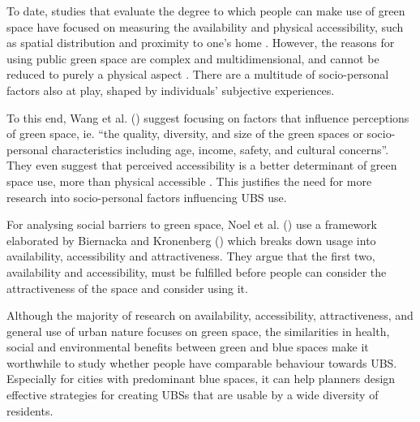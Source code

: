 \documentclass{article}
\begin{document}
To date, studies that evaluate the degree to which people can make use of green space have focused on measuring the availability and physical accessibility, such as spatial distribution and proximity to one's home \parencite{REF}.
However, the reasons for using public green space are complex and multidimensional, and cannot be reduced to purely a physical aspect \parencite{wang2015physical}. There are a multitude of socio-personal factors also at play, shaped by individuals' subjective experiences. %

To this end, Wang et al. (\citeyear{wang2015physical}) suggest focusing on factors that influence perceptions of green space, ie. ``the quality, diversity, and size of the green spaces or socio-personal characteristics including age, income, safety, and cultural concerns''. They even suggest that perceived accessibility is a better determinant of green space use, more than physical accessible \parencite{wang2015comparison}. This justifies the need for more research into socio-personal factors influencing UBS use.

For analysing social barriers to green space, Noel et al. (\citeyear{noel2021social}) use a framework elaborated by Biernacka and Kronenberg (\citeyear{biernacka2018classification}) which breaks down usage into availability, accessibility and attractiveness. They argue that the first two, availability and accessibility, must be fulfilled before people can consider the attractiveness of the space and consider using it.

Although the majority of research on availability, accessibility, attractiveness, and general use of urban nature focuses on green space, the similarities in health, social and environmental benefits between green and blue spaces make it worthwhile to study whether people have comparable behaviour towards UBS. Especially for cities with predominant blue spaces, it can help planners design effective strategies for creating UBSs that are usable by a wide diversity of residents.
\end{document}
